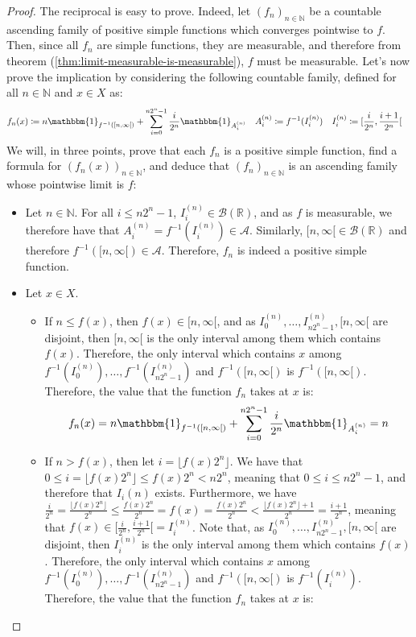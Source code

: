 \documentclass{article}
\theoremstyle{definition}
\theoremstyle{remark}
\theoremstyle{example}
\theoremstyle{notation}
\theoremstyle{axiom}
\begin{document}
\begin{proof}
		The reciprocal is easy to prove. Indeed, let $(f_n)_{n \in \mathbb{N}}$ be a countable ascending family of positive simple functions which converges pointwise to $f$. Then, since all $f_n$ are simple functions, they are measurable, and therefore from theorem (\ref{thm:limit-measurable-is-measurable}), $f$ must be measurable. Let's now prove the implication by considering the following countable family, defined for all $n \in \mathbb{N}$ and $x \in X$ as:
		\begin{align*}
				f_n(x) & \coloneq n\mathbbm{1}_{f^{-1}([n, \infty[)} + \sum_{i=0}^{n2^n - 1} \frac{i}{2^n}\mathbbm{1}_{A_i^{(n)}} & A_i^{(n)} &\coloneq f^{-1}(I_i^{(n)}) & I_i^{(n)} &\coloneq [\frac{i}{2^n}, \frac{i+1}{2^n}[
		\end{align*}
		We will, in three points, prove that each $f_n$ is a positive simple function, find a formula for $(f_n(x))_{n \in \mathbb{N}}$, and deduce that $(f_n)_{n \in \mathbb{N}}$ is an ascending family whose pointwise limit is $f$:
		\begin{itemize}
				\item Let $n \in \mathbb{N}$. For all $i \leq n2^n - 1$, $I_i^{(n)} \in \mathcal{B}(\mathbb{R})$, and as $f$ is measurable, we therefore have that $A_i^{(n)} = f^{-1}(I_i^{(n)}) \in \mathcal{A}$. Similarly, $[n, \infty[ \in \mathcal{B}(\mathbb{R})$ and therefore $f^{-1}([n, \infty[) \in \mathcal{A}$. Therefore, $f_n$ is indeed a positive simple function.	
				\item Let $x \in X$.
				\begin{itemize}
						\item If $n \leq f(x)$, then $f(x) \in [n, \infty[$, and as $I_0^{(n)}, \dots, I_{n2^n - 1}^{(n)}, [n, \infty[$ are disjoint, then $[n, \infty[$ is the only interval among them which contains $f(x)$. Therefore, the only interval which contains $x$ among $f^{-1}(I_0^{(n)}), \dots, f^{-1}(I_{n2^n - 1}^{(n)})$ and $f^{-1}([n, \infty[)$ is $f^{-1}([n, \infty[)$. Therefore, the value that the function $f_n$ takes at $x$ is:
								$$f_n(x) = n\mathbbm{1}_{f^{-1}([n, \infty[)} + \sum_{i=0}^{n2^n - 1} \frac{i}{2^n}\mathbbm{1}_{A_i^{(n)}} = n$$
						\item If $n > f(x)$, then let $i = \lfloor f(x) 2^n \rfloor$. We have that $0 \leq i = \lfloor f(x)2^n \rfloor \leq f(x)2^n < n2^n$, meaning that $0 \leq i \leq n2^n - 1$, and therefore that $I_i{(n)}$ exists. Furthermore, we have $\frac{i}{2^n} = \frac{\lfloor f(x) 2^n\rfloor}{2^n} \leq \frac{f(x)2^n}{2^n} = f(x) = \frac{f(x)2^n}{2^n} < \frac{\lfloor f(x)2^n \rfloor + 1}{2^n} = \frac{i + 1}{2^n}$, meaning that $f(x) \in [\frac{i}{2^n}, \frac{i + 1}{2^n}[ = I_i^{(n)}$. Note that, as $I_0^{(n)}, \dots, I_{n2^n - 1}^{(n)}, [n, \infty[$ are disjoint, then $I_i^{(n)}$ is the only interval among them which contains $f(x)$. Therefore, the only interval which contains $x$ among $f^{-1}(I_0^{(n)}), \dots, f^{-1}(I_{n2^n - 1}^{(n)})$ and $f^{-1}([n, \infty[)$ is $f^{-1}(I_i^{(n)})$. Therefore, the value that the function $f_n$ takes at $x$ is:

\end{itemize}
\end{itemize}
\end{proof}
\end{document}

